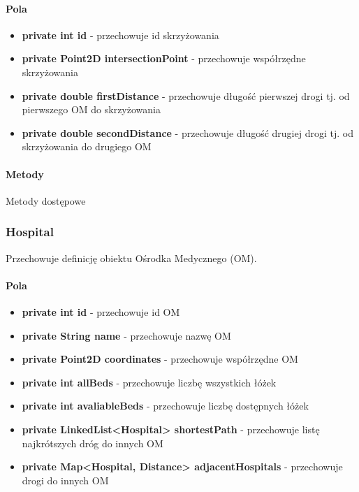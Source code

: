 \documentclass[]{article}
\begin{document}
                \paragraph{Pola}
                    \begin{itemize}
                        \item \textbf{private int id} - przechowuje id skrzyżowania
                        \item \textbf{private Point2D intersectionPoint} - przechowuje współrzędne skrzyżowania
                        \item \textbf{private double firstDistance} - przechowuje długość pierwszej drogi tj. od pierwszego OM do skrzyżowania
                        \item \textbf{private double secondDistance} - przechowuje długość drugiej drogi tj. od skrzyżowania do drugiego OM
                    \end{itemize}
            
                \paragraph{Metody}
                    Metody dostępowe
              
                    
            \subsubsection{Hospital}
                    Przechowuje definicję obiektu Ośrodka Medycznego (OM).
                \paragraph{Pola}
                    \begin{itemize}
                        \item \textbf{private int id} - przechowuje id OM
                        \item \textbf{private String name} - przechowuje nazwę OM
                        \item \textbf{private Point2D coordinates} - przechowuje współrzędne OM
                        \item \textbf{private int allBeds} - przechowuje liczbę wszystkich łóżek
                        \item \textbf{private int avaliableBeds} - przechowuje liczbę dostępnych łóżek
                        \item \textbf{private LinkedList<Hospital> shortestPath} - przechowuje listę najkrótszych dróg do innych OM
                        \item \textbf{private Map<Hospital, Distance> adjacentHospitals} - przechowuje drogi do innych OM
                    \end{itemize}
            
\end{document}

